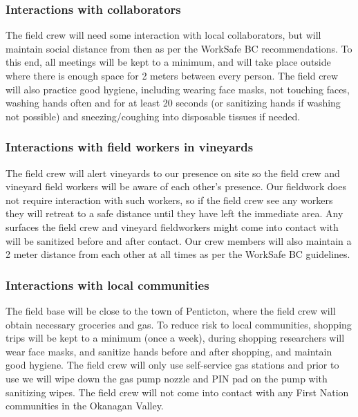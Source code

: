 \documentclass[11pt,letter]{article}
\begin{document}
\subsubsection{Interactions with collaborators}
The field crew will need some interaction with local collaborators, but will maintain social distance from then as per the WorkSafe BC recommendations. To this end, all meetings will be kept to a minimum, and will take place outside where there is enough space for 2 meters between every person. The field crew will also practice good hygiene, including wearing face masks, not touching faces, washing hands often and for at least 20 seconds (or sanitizing hands if washing not possible) and sneezing/coughing into disposable tissues if needed.  

\subsubsection{Interactions with field workers in vineyards}
The field crew will alert vineyards to our presence on site so the field crew and vineyard field workers will be aware of each other's presence. Our fieldwork does not require interaction with such workers, so if the field crew see any workers they will retreat to a safe distance until they have left the immediate area. Any surfaces the field crew and vineyard fieldworkers might come into contact with will be sanitized before and after contact. Our crew members will also maintain a 2 meter distance from each other at all times as per the WorkSafe BC guidelines.   

\subsubsection{Interactions with local communities}
The field base will be close to the town of Penticton, where the field crew will obtain necessary groceries and gas. To reduce risk to local communities, shopping trips will be kept to a minimum (once a week), during shopping researchers will wear face masks, and sanitize hands before and after shopping, and maintain good hygiene. The field crew will only use self-service gas stations and prior to use we will wipe down the gas pump nozzle and PIN pad on the pump with sanitizing wipes. The field crew will not come into contact with any First Nation communities in the Okanagan Valley. 
\end{document}
